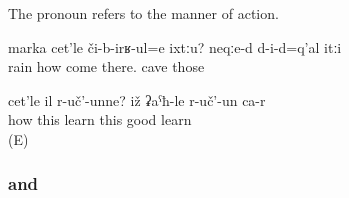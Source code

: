 
\subsubsection{ }
\label{sssec:cetle how}

The pronoun  refers to the manner of action.
%
\begin{exe}
	\ex	\label{ex:How can rain fall there? They are inside a cave}
	\gll	marka	cet'le	či-b-irʁ-ul=e	ixtːu?	neqːe-d	d-i-d=q'al	itːi\\
		rain	how	come	there.	cave		those\\
	\glt	{}

	\ex	\label{ex:How is she studying? She is studying well}
	\gll	cet'le il	r-uč'-unne?	iž ʡaˁħ-le r-uč'-un ca-r\\
		how	this	learn	this	good	learn \\
	\glt	{} (E)
\end{exe}



\subsubsection{ and  }
\label{sssec:kuti and ceruna which}

